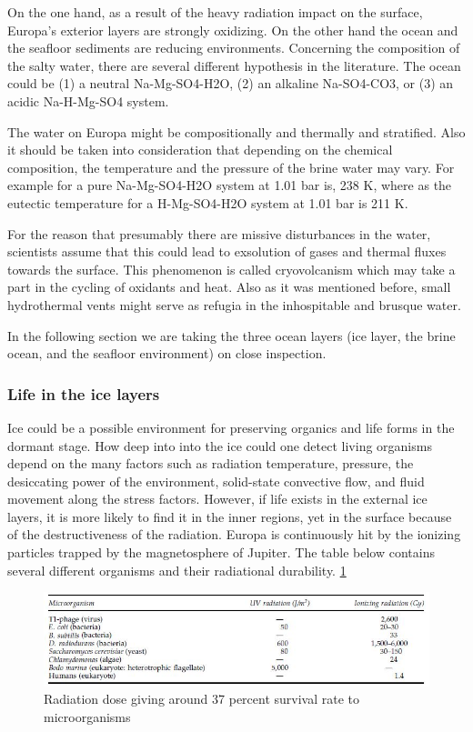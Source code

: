 On the one hand, as a result of the heavy radiation impact on the surface, Europa's exterior layers are strongly oxidizing. On the other hand the ocean and the seafloor sediments are reducing environments. Concerning the composition of the salty water, there are several different hypothesis in the literature. The ocean could be (1) a neutral Na-Mg-SO4-H2O, (2) an alkaline Na-SO4-CO3, or (3) an acidic Na-H-Mg-SO4 system.


The water on Europa might be compositionally and thermally and stratified. Also it should be taken into consideration that depending on the chemical composition, the temperature and the pressure of the brine water may vary. For example for a pure Na-Mg-SO4-H2O system at 1.01 bar is, 238 K, where as the eutectic temperature for a H-Mg-SO4-H2O system at 1.01 bar is 211 K. 


For the reason that presumably there are missive disturbances in the water, scientists assume that this could lead to exsolution of gases and thermal fluxes towards the surface. This phenomenon is called cryovolcanism which may take a part in the cycling of oxidants and heat. Also as it was mentioned before, small hydrothermal vents might serve as refugia in the inhospitable and brusque water.

In the following section we are taking the three ocean layers (ice layer, the brine ocean, and the seafloor environment) on close inspection.

\subsubsection{Life in the ice layers}

Ice could be a possible environment for preserving organics and life forms in the dormant stage. How deep into into the ice could one detect living organisms depend on the many factors such as radiation temperature, pressure, the desiccating power of the environment, solid-state convective flow, and fluid movement along the stress factors. However, if life exists in the external ice layers, it is more likely to find it in the inner regions, yet in the surface because of the destructiveness of the radiation.
Europa is continuously hit by the ionizing particles trapped by the magnetosphere of Jupiter. The table below contains several different organisms and their radiational durability. 
\ref{fig:Organisms_rad_durability}

\begin{figure}[htb]
  \centering
  \includegraphics[scale=.8]{figures/BFfig/Organisms_rad_durability}
  \caption{Radiation dose giving around 37 percent survival rate to microorganisms}
  \label{fig:Organisms_rad_durability}
\end{figure}


